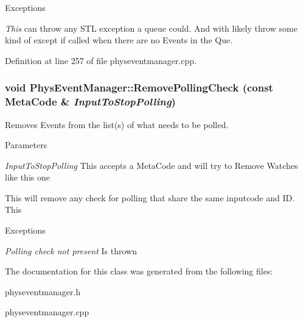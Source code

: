\begin{DoxyExceptions}{Exceptions}
\item[{\em This}]can throw any STL exception a queue could. And with likely throw some kind of except if called when there are no Events in the Que. \end{DoxyExceptions}


Definition at line 257 of file physeventmanager.cpp.

\hypertarget{classPhysEventManager_af81bf9a5f081f44a6cd91fdd19d4a42a}{
\subsubsection[{RemovePollingCheck}]{\setlength{\rightskip}{0pt plus 5cm}void PhysEventManager::RemovePollingCheck (const {\bf MetaCode} \& {\em InputToStopPolling})}}
\label{d5/dd7/classPhysEventManager_af81bf9a5f081f44a6cd91fdd19d4a42a}


Removes Events from the list(s) of what needs to be polled. 


\begin{DoxyParams}{Parameters}
\item[{\em InputToStopPolling}]This accepts a MetaCode and will try to Remove Watches like this one\end{DoxyParams}
This will remove any check for polling that share the same inputcode and ID. This 
\begin{DoxyExceptions}{Exceptions}
\item[{\em Polling check not present}]Is thrown \end{DoxyExceptions}


The documentation for this class was generated from the following files:\begin{DoxyCompactItemize}
\item 
physeventmanager.h\item 
physeventmanager.cpp\end{DoxyCompactItemize}

